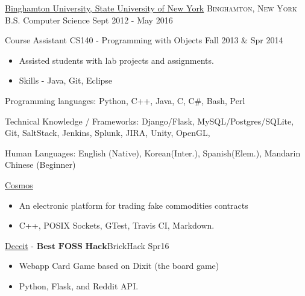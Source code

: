 \documentclass[11pt]{article}
\begin{document}
\spacedhrule{0.1em}{0.5em}  %

\headedsection
{\href{http://www.binghamton.edu/index.php}{Binghamton University, State University of New York}}
{\textsc{Binghamton, New York}} {
    \inlineheadrightdate
    {B.S. Computer Science}
    {Sept 2012 - May 2016}
    {}
}

\nobreakvspace{0.5em}  %

\headedsection  %
{}
{}
{
    \headedsubsection
    {Course Assistant CS140 - Programming with Objects}
    {Fall 2013 \& Spr 2014}
    {
        \begin{itemize}
            \item Assisted students with lab projects and assignments.
            \item Skills - Java, Git, Eclipse
        \end{itemize}
    }
}


\spacedhrule{0.1em}{0.5em}  %

\inlineskillsection  %
{Programming languages:}
{ Python, C++, Java, C, C\#, Bash, Perl }

\inlineskillsection
{Technical Knowledge / Frameworks:}
{ Django/Flask, MySQL/Postgres/SQLite, Git, SaltStack, Jenkins, Splunk, JIRA, Unity, OpenGL, \latex }

\inlineskillsection
{Human Languages:}
{English (Native), Korean(Inter.), Spanish(Elem.), Mandarin Chinese (Beginner)}



\spacedhrule{0.1em}{0.5em}  %

\projects
{{\href{https://github.com/gabeochoa/Cosmos}{Cosmos}}}{}
{
    \begin{itemize}[label={}]
        \setlength\itemsep{.005ex}
        \item{An electronic platform for trading fake commodities contracts}
        \item{C++, POSIX Sockets, GTest, Travis CI, Markdown.}
    \end{itemize}
}

\projects
{{\href{https://github.com/gabeochoa/sokim}{Deceit}} - $\textbf{Best FOSS Hack}$}{BrickHack Spr16}
{
    \begin{itemize}[label={}]
        \setlength\itemsep{.005ex}
        \item{Webapp Card Game based on Dixit (the board game)}
        \item{Python, Flask, and Reddit API.}
    \end{itemize}
}
\end{document}
